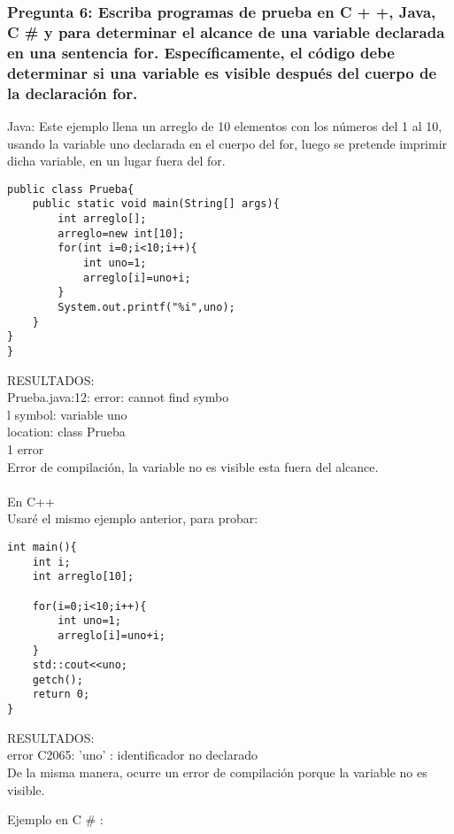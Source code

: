 \subsubsection{Pregunta 6: Escriba programas de prueba en C + +, Java, C \# y para determinar el alcance de una variable declarada en una sentencia for. Específicamente, el código debe determinar si una variable es visible después del cuerpo de la declaración for.}

Java:  Este ejemplo llena un arreglo de 10 elementos con los números del 1 al 10, usando la variable uno declarada en el cuerpo del for, luego se pretende imprimir dicha variable, en un lugar fuera del for.\\

\lstset{language = Java} 
\begin{lstlisting}[frame = single] %Comienzo del Código
public class Prueba{
	public static void main(String[] args){
		int arreglo[];
		arreglo=new int[10];
		for(int i=0;i<10;i++){
			int uno=1;
			arreglo[i]=uno+i;
		}
		System.out.printf("%i",uno);
	}
}
}
\end{lstlisting}
RESULTADOS: \\
Prueba.java:12: error: cannot find symbo\\l
 symbol:   variable uno\\
 location: class Prueba\\
1 error\\

Error de compilación, la variable no es visible esta fuera del alcance.\\
\\
En C++\\
Usaré el mismo ejemplo anterior, para probar:\\


\lstset{language = C++} 
\begin{lstlisting}[frame = single] %Comienzo del Código
int main(){
	int i;
	int arreglo[10];
	
	for(i=0;i<10;i++){
		int uno=1;
		arreglo[i]=uno+i;
	}
	std::cout<<uno;
	getch();
	return 0;
}
\end{lstlisting}


RESULTADOS:\\ 
error C2065: 'uno' : identificador no declarado\\
De la misma manera, ocurre un error de compilación porque la variable no es visible.

Ejemplo en C \# : \\

